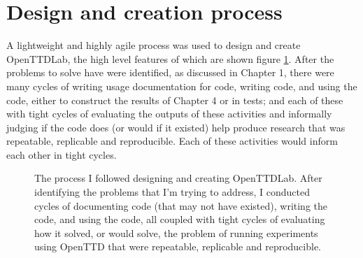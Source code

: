 \documentclass[logo,msc,dsti]{infthesis}    %
\begin{document}
\section{Design and creation process}

A lightweight and highly agile process was used to design and create OpenTTDLab, the high level features of which are shown figure \ref{fig:solo-agile}. After the problems to solve have were identified, as discussed in Chapter 1, there were many cycles of writing usage documentation for code, writing code, and using the code, either to construct the results of Chapter 4 or in tests; and each of these with tight cycles of evaluating the outputs of these activities and informally judging if the code does (or would if it existed) help produce research that was repeatable, replicable and reproducible. Each of these activities would inform each other in tight cycles.

\begin{figure}[h]
\centering
{}
\caption{The process I followed designing and creating OpenTTDLab. After identifying the problems that I'm trying to address, I conducted cycles of documenting code (that may not have existed), writing the code, and using the code, all coupled with tight cycles of evaluating how it solved, or would solve, the problem of running experiments using OpenTTD that were repeatable, replicable and reproducible.}
\label{fig:solo-agile}
\end{figure}
\end{document}
